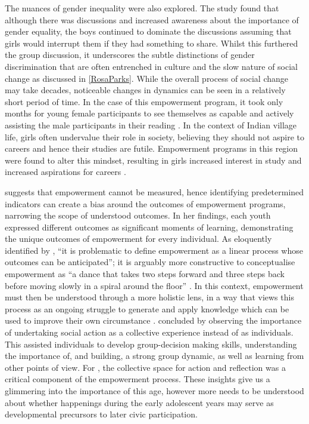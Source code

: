 The nuances of gender inequality were also explored. The study found that although there was discussions and increased awareness about the importance of gender equality, the boys continued to dominate the discussions assuming that girls would interrupt them if they had something to share. Whilst this furthered the group discussion, it underscores the subtle distinctions of gender discrimination that are often entrenched in culture and the slow nature of social change as discussed in \ref{RosaParks}. \label{RosaParks}%
While the overall process of social change may take decades, noticeable changes in dynamics can be seen in a relatively short period of time. In the case of this empowerment program, it took only months for young female participants to see themselves as capable and actively assisting the male participants in their reading \citep{Merchant2013}. In the context of Indian village life, girls often undervalue their role in society, believing they should not aspire to careers and hence their studies are futile. Empowerment programs in this region were found to alter this mindset, resulting in girls increased interest in study and increased aspirations for careers \citep{Merchant2013}.


\citet{Merchant2013} suggests that empowerment cannot be measured, hence identifying predetermined indicators can create a bias around the outcomes of empowerment programs, narrowing the scope of understood outcomes. In her findings, each youth expressed different outcomes as significant moments of learning, demonstrating the unique outcomes of empowerment for every individual. As eloquently identified by \citet[][p23]{Merchant2013}, “it is problematic to define empowerment as a linear process whose outcomes can be anticipated”; it is arguably more constructive to conceptualise empowerment as “a dance that takes two steps forward and three steps back before moving slowly in a spiral around the floor” \citep[VeneKlasen and Miller 2006, p54 as cited in][p23]{Merchant2013}. In this context, empowerment must then be understood through a more holistic lens, in a way that views this process as an ongoing struggle to generate and apply knowledge which can be used to improve their own circumstance \citep{Merchant2013}. \citet{Merchant2013} concluded by observing the importance of undertaking social action as a collective experience instead of as individuals. This assisted individuals to develop group-decision making skills, understanding the importance of, and building, a strong group dynamic, as well as learning from other points of view. For \citet{Merchant2013}, the collective space for action and reflection was a critical component of the empowerment process. These insights give us a glimmering into the importance of this age, however more needs to be understood about whether happenings during the early adolescent years may serve as developmental precursors to later civic participation. 


